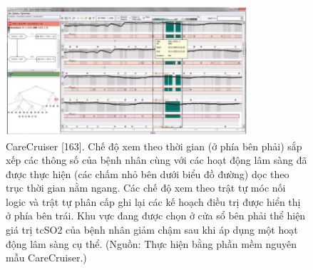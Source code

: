 \begin{figure}[H] %
    \centering %
    \includegraphics[width=0.8\textwidth]{assets/fig_7_10.png} 
    \caption{CareCruiser [163]. Chế độ xem theo thời gian (ở phía bên phải) sắp xếp các thông số của bệnh nhân cùng với các hoạt động lâm sàng đã được thực hiện (các chấm nhỏ bên dưới biểu đồ đường) dọc theo trục thời gian nằm ngang. Các chế độ xem theo trật tự móc nối logic và trật tự phân cấp ghi lại các kế hoạch điều trị được hiển thị ở phía bên trái. Khu vực đang được chọn ở cửa sổ bên phải thể hiện giá trị tcSO2 của bệnh nhân giảm chậm sau khi áp dụng một hoạt động lâm sàng cụ thể. (Nguồn: Thực hiện bằng phần mềm nguyên mẫu CareCruiser.)} %
    \label{fig:f7.10}
\end{figure}